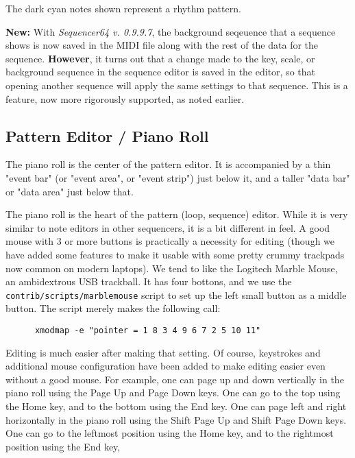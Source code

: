    The dark cyan notes shown represent a rhythm pattern.

   \textbf{New:}
   With \textsl{Sequencer64 v. 0.9.9.7}, the background seqeuence that a
   sequence shows is now saved in the MIDI file along with the rest of the
   data for the sequence.
   \textbf{However},
   it turns out that a change made to the key, scale, or background sequence in
   the sequence editor is saved in the editor, so that opening another sequence
   will apply the same settings to that sequence.  This is a feature, now
   more rigorously supported, as noted earlier.

\subsection{Pattern Editor / Piano Roll}
\label{subsec:seq64_pattern_editor_piano_roll}

   The piano roll is the center of the pattern editor.  It is accompanied by a
   thin "event bar" (or "event area", or "event strip") just below it,
   and a taller "data bar" or "data area" just below that.

   The piano roll is the heart of the pattern (loop, sequence) editor.
   While it is very similar to note editors in other sequencers, it is a bit
   different in feel.  A good mouse with 3 or more buttons is practically a
   necessity for editing (though we have added some features to make it
   usable with some pretty crummy trackpads now common on modern laptops).
   We tend to like the Logitech Marble Mouse, an
   ambidextrous USB trackball.  It has four bottons, and we use the
   \texttt{contrib/scripts/marblemouse} script to set up the left small
   button as a middle button.  The script merely makes the following call:

   \begin{verbatim}
      xmodmap -e "pointer = 1 8 3 4 9 6 7 2 5 10 11"
   \end{verbatim}

   Editing is much easier after making that setting.   Of course, keystrokes
   and additional mouse configuration have been added to make editing easier
   even without a good mouse.
   For example, one can page up and down vertically in the piano roll using the
    Page Up and 
    Page Down keys.
   One can go to the top using the 
    Home key, and
   to the bottom using the
    End key.
   One can page left and right horizontally in the piano roll using the
    Shift Page Up and 
    Shift Page Down keys.
   One can go to the leftmost position using the 
    Home key,
   and to the rightmost position using the
    End key,

